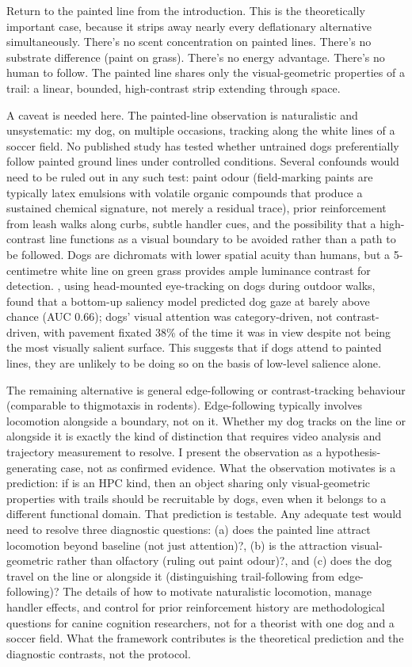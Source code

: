 \documentclass[12pt]{article}
\begin{document}
Return to the painted line from the introduction. This is the theoretically important case, because it strips away nearly every deflationary alternative simultaneously. There's no scent concentration on painted lines. There's no substrate difference (paint on grass). There's no energy advantage. There's no human to follow. The painted line shares only the visual-geometric properties of a trail: a linear, bounded, high-contrast strip extending through space.

A caveat is needed here. The painted-line observation is naturalistic and unsystematic: my dog, on multiple occasions, tracking along the white lines of a soccer field. No published study has tested whether untrained dogs preferentially follow painted ground lines under controlled conditions. Several confounds would need to be ruled out in any such test: paint odour (field-marking paints are typically latex emulsions with volatile organic compounds that produce a sustained chemical signature, not merely a residual trace), prior reinforcement from leash walks along curbs, subtle handler cues, and the possibility that a high-contrast line functions as a visual boundary to be avoided rather than a path to be followed. Dogs are dichromats with lower spatial acuity than humans, but a 5-centimetre white line on green grass provides ample luminance contrast for detection. \textcite{pelgrim2025}, using head-mounted eye-tracking on dogs during outdoor walks, found that a bottom-up saliency model predicted dog gaze at barely above chance (AUC 0.66); dogs' visual attention was category-driven, not contrast-driven, with pavement fixated 38\% of the time it was in view despite not being the most visually salient surface. This suggests that if dogs attend to painted lines, they are unlikely to be doing so on the basis of low-level salience alone.

The remaining alternative is general edge-following or contrast-tracking behaviour (comparable to thigmotaxis in rodents). Edge-following typically involves locomotion alongside a boundary, not on it. Whether my dog tracks on the line or alongside it is exactly the kind of distinction that requires video analysis and trajectory measurement to resolve. I present the observation as a hypothesis-generating case, not as confirmed evidence. What the observation motivates is a prediction: if  is an HPC kind, then an object sharing only visual-geometric properties with trails should be recruitable by dogs, even when it belongs to a different functional domain. That prediction is testable. Any adequate test would need to resolve three diagnostic questions: (a) does the painted line attract locomotion beyond baseline (not just attention)?, (b) is the attraction visual-geometric rather than olfactory (ruling out paint odour)?, and (c) does the dog travel on the line or alongside it (distinguishing trail-following from edge-following)? The details of how to motivate naturalistic locomotion, manage handler effects, and control for prior reinforcement history are methodological questions for canine cognition researchers, not for a theorist with one dog and a soccer field. What the framework contributes is the theoretical prediction and the diagnostic contrasts, not the protocol.
\end{document}
